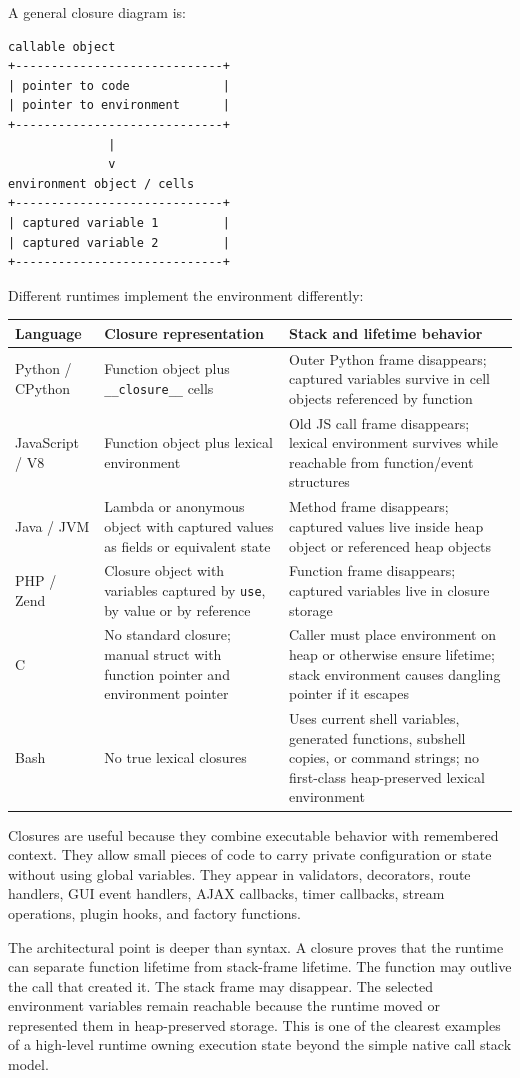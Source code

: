 A general closure diagram is:

\begin{verbatim}
callable object
+-----------------------------+
| pointer to code             |
| pointer to environment      |
+-----------------------------+
              |
              v
environment object / cells
+-----------------------------+
| captured variable 1         |
| captured variable 2         |
+-----------------------------+
\end{verbatim}

Different runtimes implement the environment differently:

\begin{center}
\begin{tabular}{|p{}|p{}|p{}|}
\hline
\textbf{Language} & \textbf{Closure representation} & \textbf{Stack and lifetime behavior} \\
\hline
Python / CPython & Function object plus \texttt{\_\_closure\_\_} cells & Outer Python frame disappears; captured variables survive in cell objects referenced by function \\
\hline
JavaScript / V8 & Function object plus lexical environment & Old JS call frame disappears; lexical environment survives while reachable from function/event structures \\
\hline
Java / JVM & Lambda or anonymous object with captured values as fields or equivalent state & Method frame disappears; captured values live inside heap object or referenced heap objects \\
\hline
PHP / Zend & Closure object with variables captured by \texttt{use}, by value or by reference & Function frame disappears; captured variables live in closure storage \\
\hline
C & No standard closure; manual struct with function pointer and environment pointer & Caller must place environment on heap or otherwise ensure lifetime; stack environment causes dangling pointer if it escapes \\
\hline
Bash & No true lexical closures & Uses current shell variables, generated functions, subshell copies, or command strings; no first-class heap-preserved lexical environment \\
\hline
\end{tabular}
\end{center}

Closures are useful because they combine executable behavior with remembered context. They allow small pieces of code to carry private configuration or state without using global variables. They appear in validators, decorators, route handlers, GUI event handlers, AJAX callbacks, timer callbacks, stream operations, plugin hooks, and factory functions.

The architectural point is deeper than syntax. A closure proves that the runtime can separate function lifetime from stack-frame lifetime. The function may outlive the call that created it. The stack frame may disappear. The selected environment variables remain reachable because the runtime moved or represented them in heap-preserved storage. This is one of the clearest examples of a high-level runtime owning execution state beyond the simple native call stack model.


